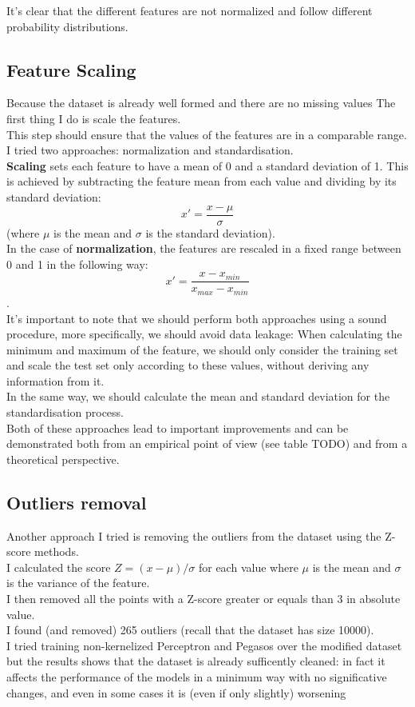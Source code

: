 It's clear that the different features are not normalized and follow different probability distributions.

\subsection{Feature Scaling}
Because the dataset is already well formed and there are no missing values The first thing I do is scale the features.\\
This step should ensure that the values of the features are in a comparable range.\\
I tried two approaches: normalization and standardisation.\\
{\bf Scaling} sets each feature to have a mean of 0 and a standard deviation of 1.
This is achieved by subtracting the feature mean from each value and dividing by its standard deviation:
$$x' = \frac{x - \mu}{\sigma} $$
(where $\mu$ is the mean and $\sigma$ is the standard deviation).\\
In the case of {\bf normalization}, the features are rescaled in a fixed range between 0 and 1 in the following way: $$x' = \frac{x - x_{min}}{x_{max} - x_{min}} $$.\\
It's important to note that we should perform both approaches using a sound procedure, more specifically, we should avoid data leakage:
When calculating the minimum and maximum of the feature, we should only consider the training set and scale the test set only according to these values, without deriving any information from it.\\
In the same way, we should calculate the mean and standard deviation for the standardisation process.\\
Both of these approaches lead to important improvements and can be demonstrated both from an empirical point of view (see table TODO) and from a theoretical perspective.



\subsection{Outliers removal}
Another approach I tried is removing the outliers from the dataset using the Z-score methods.\\
I calculated the score $ Z = (x - \mu) / \sigma$ for each value where $\mu$ is the mean and $\sigma$ is the variance of the feature.\\
I then removed all the points with a Z-score greater or equals than $3$ in absolute value.\\
I found (and removed) 265 outliers (recall that the dataset has size 10000).\\
I tried training non-kernelized Perceptron and Pegasos over the modified dataset but the results shows that the dataset is already sufficently cleaned: in fact it  
affects the performance of the models in a minimum way with no significative changes, and even in some cases it is (even if only slightly) worsening\\

